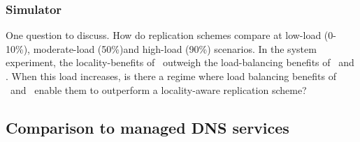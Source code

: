 

\subsubsection{Simulator}



One question to discuss. How do replication schemes compare at low-load (0-10\%), moderate-load (50\%)and high-load (90\%) scenarios. In the system experiment, the locality-benefits of \locaware\ outweigh the load-balancing benefits of \uniform\ and \codons. When this load increases, is there a regime where load balancing benefits of \uniform\ and \codons\ enable them to outperform a locality-aware replication scheme? 


\subsection{Comparison to managed DNS services}




